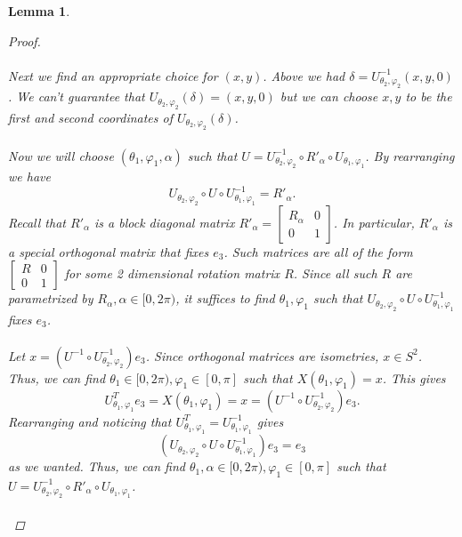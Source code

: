 \documentclass[a4paper]{amsart}
\newtheorem{lem}[thm]{Lemma}
\renewcommand{\phi}{\varphi}
\theoremstyle{remark}
\begin{document}
\begin{lem}
\begin{proof}
\\\\
Next we find an appropriate choice for $(x,y)$. Above we had $\delta=U^{-1}_{\theta_2,\phi_2}(x,y,0)$. We can't guarantee that $U_{\theta_2,\phi_2}(\delta)=(x,y,0)$ but we can choose $x,y$ to be the first and second coordinates of $U_{\theta_2,\phi_2}(\delta)$.
\\\\
Now we will choose $(\theta_1,\phi_1,\alpha)$ such that $U=U_{\theta_2,\phi_2}^{-1}\circ R'_\alpha \circ U_{\theta_1,\phi_1}$. By rearranging we have $$U_{\theta_2,\phi_2}\circ U\circ  U_{\theta_1,\phi_1}^{-1}=R'_\alpha.$$ Recall that $R'_\alpha$ is a block diagonal matrix $R'_\alpha=\begin{bmatrix} R_\alpha & 0 \\ 0 & 1 \end{bmatrix}$. In particular, $R'_\alpha$ is a special orthogonal matrix that fixes $e_3$. Such matrices are all of the form $\begin{bmatrix} R & 0 \\ 0 & 1 \end{bmatrix}$ for some 2 dimensional rotation matrix $R$. Since all such $R$ are parametrized by $R_\alpha, \alpha\in[0,2\pi)$, it suffices to find $\theta_1,\phi_1$ such that $U_{\theta_2,\phi_2}\circ U\circ  U_{\theta_1,\phi_1}^{-1}$ fixes $e_3$.
\\\\
Let $x=(U^{-1}\circ U_{\theta_2,\phi_2}^{-1})e_3$. Since orthogonal matrices are isometries, $x\in S^2$. Thus, we can find $\theta_1\in [0,2\pi), \phi_1\in[0,\pi]$ such that $X(\theta_1,\phi_1)=x$. This gives $$U_{\theta_1,\phi_1}^Te_3=X(\theta_1,\phi_1)=x=(U^{-1}\circ U_{\theta_2,\phi_2}^{-1})e_3.$$ Rearranging and noticing that $U_{\theta_1,\phi_1}^T=U_{\theta_1,\phi_1}^{-1}$ gives $$(U_{\theta_2,\phi_2}\circ U\circ  U_{\theta_1,\phi_1}^{-1})e_3=e_3$$ as we wanted. Thus, we can find $\theta_1,\alpha\in[0,2\pi),\phi_1\in[0,\pi]$ such that $U=U_{\theta_2,\phi_2}^{-1}\circ R'_\alpha \circ U_{\theta_1,\phi_1}$.
\\\\

\end{proof}
\end{lem}
\end{document}
